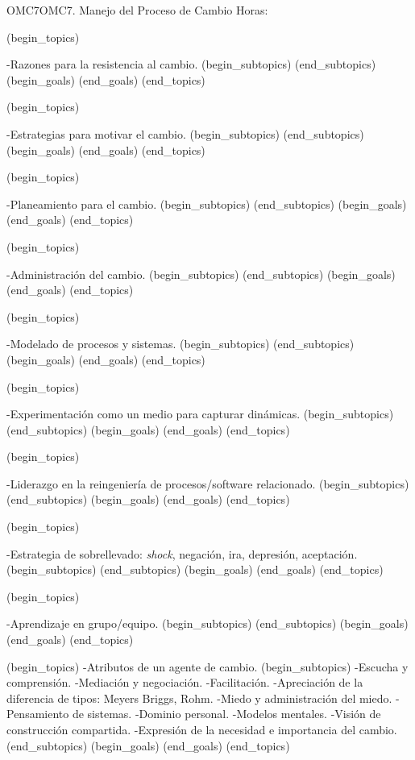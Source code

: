 \begin{BKL2}{OMC7}{OMC7. Manejo del Proceso de Cambio}
Horas:

 

(begin_topics)

-Razones para la resistencia al cambio.
(begin_subtopics)
(end_subtopics)
(begin_goals)
(end_goals)
(end_topics)

 

(begin_topics)

-Estrategias para motivar el cambio.
(begin_subtopics)
(end_subtopics)
(begin_goals)
(end_goals)
(end_topics)

 

(begin_topics)

-Planeamiento para el cambio.
(begin_subtopics)
(end_subtopics)
(begin_goals)
(end_goals)
(end_topics)

 

(begin_topics)

-Administración del cambio.
(begin_subtopics)
(end_subtopics)
(begin_goals)
(end_goals)
(end_topics)

 

(begin_topics)

-Modelado de procesos y sistemas.
(begin_subtopics)
(end_subtopics)
(begin_goals)
(end_goals)
(end_topics)

 

(begin_topics)

-Experimentación como un medio para capturar dinámicas.
(begin_subtopics)
(end_subtopics)
(begin_goals)
(end_goals)
(end_topics)

 

(begin_topics)

-Liderazgo en la reingeniería de procesos/software relacionado.
(begin_subtopics)
(end_subtopics)
(begin_goals)
(end_goals)
(end_topics)

 

(begin_topics)

-Estrategia de sobrellevado: {\it shock}, negación, ira, depresión, aceptación.
(begin_subtopics)
(end_subtopics)
(begin_goals)
(end_goals)
(end_topics)

 

(begin_topics)

-Aprendizaje en grupo/equipo.
(begin_subtopics)
(end_subtopics)
(begin_goals)
(end_goals)
(end_topics)


(begin_topics)
-Atributos de un agente de cambio.
(begin_subtopics)
-Escucha y comprensión.
-Mediación y negociación.
-Facilitación.
-Apreciación de la diferencia de tipos: Meyers Briggs, Rohm.
-Miedo y administración del miedo.
-Pensamiento de sistemas.
-Dominio personal.
-Modelos mentales.
-Visión de construcción compartida.
-Expresión de la necesidad e importancia del cambio.
(end_subtopics)
(begin_goals)
(end_goals)
(end_topics)


\end{BKL2}

